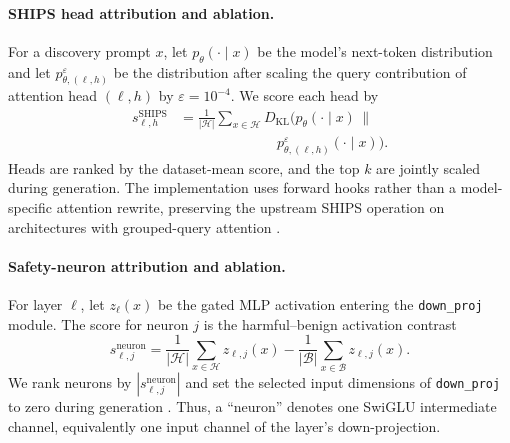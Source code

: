 \paragraph{SHIPS head attribution and ablation.}
For a discovery prompt $x$, let $p_\theta(\cdot\mid x)$ be the model's
next-token distribution and let $p_{\theta,(\ell,h)}^{\varepsilon}$ be the
distribution after scaling the query contribution of attention head
$(\ell,h)$ by $\varepsilon=10^{-4}$. We score each head by
\begin{align}
 s_{\ell,h}^{\mathrm{SHIPS}}
 &=\frac{1}{|\mathcal{H}|}\sum_{x\in\mathcal{H}}
   D_{\mathrm{KL}}\!\bigl(
     p_\theta(\cdot\mid x)\,\big\|\,\nonumber\\[-2pt]
 &\hspace{7em}
     p_{\theta,(\ell,h)}^{\varepsilon}(\cdot\mid x)
   \bigr).
 \label{eq:appendix-ships}
\end{align}
Heads are ranked by the dataset-mean score, and the top $k$ are jointly scaled
during generation. The implementation uses forward hooks rather than a
model-specific attention rewrite, preserving the upstream SHIPS operation on
architectures with grouped-query attention \citep{zhou2024ships}.

\paragraph{Safety-neuron attribution and ablation.}
For layer $\ell$, let $z_\ell(x)$ be the gated MLP activation entering the
\texttt{down\_proj} module. The score for neuron $j$ is the harmful--benign
activation contrast
\begin{equation}
 s_{\ell,j}^{\mathrm{neuron}}
 =\frac{1}{|\mathcal{H}|}\sum_{x\in\mathcal{H}}z_{\ell,j}(x)
 -\frac{1}{|\mathcal{B}|}\sum_{x\in\mathcal{B}}z_{\ell,j}(x).
 \label{eq:appendix-neuron}
\end{equation}
We rank neurons by $|s_{\ell,j}^{\mathrm{neuron}}|$ and set the selected input
dimensions of \texttt{down\_proj} to zero during generation
\citep{zhao2025neuron}. Thus, a ``neuron'' denotes one SwiGLU intermediate
channel, equivalently one input channel of the layer's down-projection.


